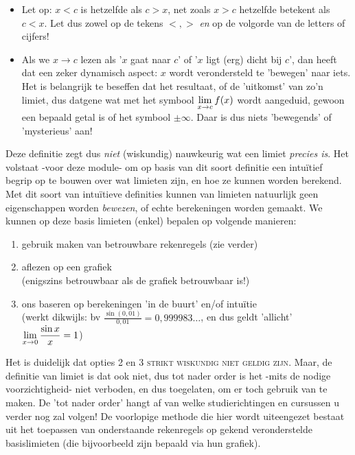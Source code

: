 \documentclass[numbers]{ximera}
\begin{document}
\begin{remark}

\begin{itemize}	
\item Let op: $x<c$ is hetzelfde als  $c>x$, net zoals  $x>c$ hetzelfde betekent als $c<x$. Let dus zowel op de tekens $<,>$ \textit{en} op de volgorde van de letters of cijfers!  

\item Als we  $x\to c$ lezen als '$x$ gaat naar $c$' of '$x$ ligt (erg) dicht bij $c$', dan heeft dat een zeker dynamisch aspect: $x$ wordt verondersteld te 'bewegen' naar iets. Het is belangrijk te beseffen dat het resultaat, of de 'uitkomst' van zo'n limiet, dus datgene wat met het symbool $\limxc f(x)$ wordt aangeduid, gewoon een bepaald getal is of het symbool $\pm\infty$. Daar is dus niets 'bewegends' of 'mysterieus' aan!
\end{itemize}

\end{remark}


Deze definitie zegt dus \textit{niet} (wiskundig) nauwkeurig wat een limiet \textit{precies is}. Het volstaat -voor deze module- om op basis van dit soort definitie een intuïtief begrip op te bouwen over wat limieten zijn, en hoe ze kunnen worden berekend. Met dit soort van intuïtieve definities kunnen van limieten natuurlijk geen eigenschappen worden \textit{bewezen}, of echte berekeningen worden gemaakt. We kunnen op deze basis limieten (enkel) bepalen op volgende manieren:
\begin{enumerate}
	\item gebruik maken van betrouwbare rekenregels (zie verder)
	\item aflezen op een grafiek  
	\\(enigszins betrouwbaar als de grafiek betrouwbaar is!)
	\item ons baseren op berekeningen 'in de buurt' en/of intuïtie 
	\\(werkt dikwijls: bv $\frac{\sin(0,01)}{0,01}=0,999983\dots$, en dus geldt 'allicht' $\limx \frac{\sin x}{x} = 1$)
\end{enumerate}
Het is duidelijk dat opties 2 en  3 \textsc{strikt wiskundig niet geldig zijn}. Maar, de definitie van limiet is dat ook niet, dus tot nader order is het -mits de nodige voorzichtigheid- niet verboden, en dus toegelaten, om er toch gebruik van te maken. De 'tot nader order' hangt af van welke studierichtingen en cursussen u verder nog zal volgen! De voorlopige methode die hier wordt uiteengezet bestaat uit het toepassen van onderstaande rekenregels op gekend veronderstelde basislimieten (die bijvoorbeeld zijn bepaald via hun grafiek). 
\end{document}
